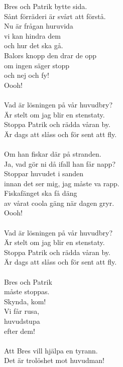 \documentclass[a6paper, 10pt, twoside]{article}
\begin{document}
\begin{center}
\end{center}
\begin{lyrics}
Bres och Patrik bytte sida. \\
Sånt förräderi är svårt att förstå. \\
Nu är frågan huruvida \\ 
vi kan hindra dem \\
och hur det ska gå. \\
Balors knopp den drar de opp \\
om ingen säger stopp \\
och nej och fy! \\
Oooh! \\
\\
Vad är lösningen på vår huvudbry? \\
Är stelt om jag blir en stenstaty. \\
Stoppa Patrik och rädda våran by. \\
Är dags att slåss och för sent att fly. \\
\\
Om han fiskar där på stranden. \\
Ja, vad gör ni då ifall han får napp? \\
Stoppar huvudet i sanden \\
innan det ser mig, jag måste va rapp. \\
Fiskafänget ska få däng \\
av vårat coola gäng
när dagen gryr. \\
Oooh! \\
\\
Vad är lösningen på vår huvudbry?\\
Är stelt om jag blir en stenstaty.\\
Stoppa Patrik och rädda våran by. \\
Är dags att slåss och för sent att fly. \\
\\
Bres och Patrik \\
måste stoppas. \\
Skynda, kom! \\
Vi får rusa, \\
huvudstupa \\
efter dem! \\
\\
Att Bres vill hjälpa en tyrann. \\
Det är trolöshet mot huvudman! \\

\end{lyrics}
\end{document}
